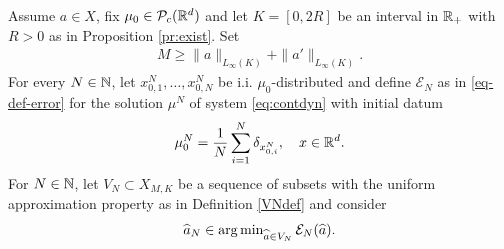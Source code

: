 \begin{theorem}\label{thm} Assume $a\in X$, fix $\mu_0 \in \mathcal{P}_c(\mathbb{R}^d)$ and let  $K=[0,2R]$ be an interval in $\mathbb{R}_+$ with $R>0$ as in Proposition \ref{pr:exist}.
	Set
	\begin{align*}
	M \geq \|a\|_{L_{\infty}(K)} + \|a'\|_{L_{\infty}(K)}.
	\end{align*}
	For every $N \in \mathbb{N}$, let $x^N_{0,1},\ldots,x^N_{0,N}$ be i.i. $\mu_0$-distributed and define $\mathcal E_N$ as in \eqref{eq-def-error} for the solution $\mu^N$ of system \eqref{eq:contdyn} with initial datum
	\begin{align*}
	\mu^{N}_0 = \frac{1}{N}\sum^N_{i = 1} \delta_{x^{N}_{0,i}}, \quad x \in \mathbb{R}^d.
	\end{align*}
	For  $N \in \mathbb{N}$, let $V_N\subset X_{M,K}$ be a sequence of subsets with the uniform approximation property as in Definition \ref{VNdef} and consider
	\begin{align*}
		\widehat a_N\in\operatorname{arg\,min}_{\widehat a\in V_N} \mathcal E_N(\widehat a).
	\end{align*}
	

\end{theorem}

